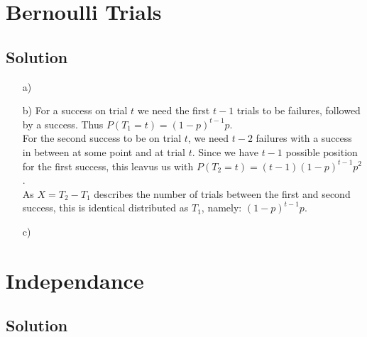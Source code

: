 \documentclass[10pt]{article}
\numberwithin{equation}{section}
\begin{document}
\section*{Bernoulli Trials}
\subsection*{Solution}

\begin{enumerate}
\item[a)]{

}
\item[b)]{
    For a success on trial $t$ we need the first $t-1$ trials to be failures, followed by a success. Thus $P(T_1 = t) = (1-p)^{t-1}p$.\\
    For the second success to be on trial $t$, we need $t-2$ failures with a success in between at some point and at trial $t$. Since we have $t-1$ possible position for the first success, this leavus us with $P(T_2 = t) = (t-1)(1-p)^{t-1}p^2$.\\
    As $X = T_2 - T_1$ describes the number of trials between the first and second success, this is identical distributed as $T_1$, namely: $(1-p)^{t-1}p$.\\
}
\item[c)]{


}
\end{enumerate}

\section*{Independance}
\subsection*{Solution}
\end{document}
